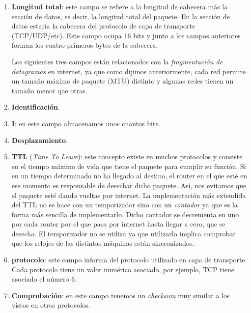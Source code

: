 \documentclass[10pt,a4paper,spanish]{report}
\begin{document}
\begin{enumerate}[\color{tema4}{$\heartsuit$}]
  \item \textcolor{tema4}{\textbf{Longitud total}}: este campo se refiere a la longitud de cabecera más la sección de datos, es decir, la longitud total del paquete. En la sección de datos estaría la cabecera del protocolo de capa de transporte (TCP/UDP/etc). Este campo ocupa 16 bits y junto a los campos anteriores forman los cuatro primeros bytes de la cabecera.

  Los siguientes tres campos están relacionados con la \textcolor{tema4}{\textit{fragmentación de datagramas}} en internet, ya que como dijimos anteriormente, cada red permite un tamaño máximo de paquete (MTU) distinto y algunas redes tienen un tamaño menor que otras.

  \item \textcolor{tema4}{\textbf{Identificación}}.

  \item \textcolor{tema4}{\textbf{I}}: en este campo almacenamos unos cuantos bits. 

  \item \textcolor{tema4}{\textbf{Desplazamiento}}.

  \item \textcolor{tema4}{\textbf{TTL}} (\textcolor{tema4}{\textit{Time To Leave}}): este concepto existe en muchos protocolos y consiste en el tiempo máximo de vida que tiene el paquete para cumplir su función. Si en un tiempo determinado no ha llegado al destino, el router en el que esté en ese momento es responsable de desechar dicho paquete. Así, nos evitamos que el paquete esté dando vueltas por internet. La implementación más extendida del TTL no se hace con un temporizador sino con un \textit{\textcolor{tema4}{contador}} ya que es la forma más sencilla de implementarlo. Dicho contador se decrementa en uno por cada router por el que pasa por internet hasta llegar a cero, que se desecha. El temporizador no se utiliza ya que utilizarlo implica comprobar que los relojes de las distintas máquinas están sincronizados.

  \item \textcolor{tema4}{\textbf{protocolo}}: este campo informa del protocolo utilizado en capa de transporte. Cada protocolo tiene un valor numérico asociado, por ejemplo, TCP tiene asociado el número 6.

  \item \textcolor{tema4}{\textbf{Comprobación}}: en este campo tenemos un \textit{\textcolor{tema4}{checksum}} muy similar a los vistos en otros protocolos.


\end{enumerate}
\end{document}
